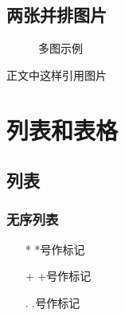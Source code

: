 \documentclass[utf8]{ctexart}
\begin{document}
\subsection{两张并排图片}
\begin{figure}
  \centering
  \quad
  \caption{多图示例}
\end{figure}

正文中这样引用图片

\section{列表和表格}
\subsection{列表}
\subsubsection{无序列表}
\begin{itemize}
  \item[*] *号作标记
  \item[+] +号作标记
  \item[.] .号作标记
\end{itemize}
\end{document}
